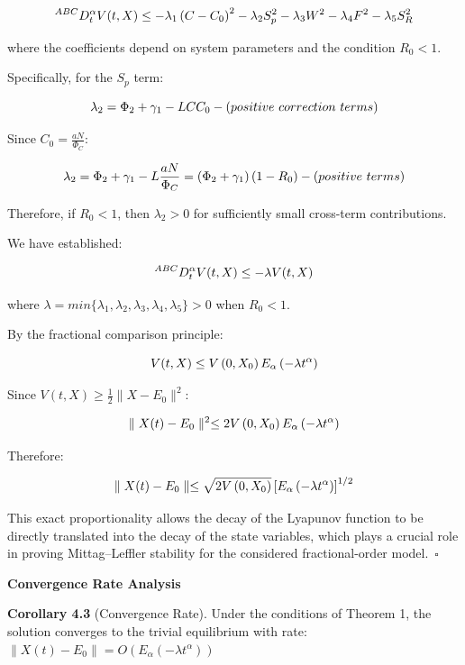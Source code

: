 \documentclass[10pt]{NSP1}
\newcommand{\fitwidth}[1]{\resizebox{\ifdim\width>\linewidth\linewidth\else\width\fi}{!}{#1}}
\begin{document}
\[
\fitwidth{$\displaystyle ^{ABC}D_{t}^{\alpha}V(t,X) \leq - \lambda_{1}\left( C - C_{0} \right)^{2} - \lambda_{2}S_{p}^{2} - \lambda_{3}W^{2} - \lambda_{4}F^{2} - \lambda_{5}S_{R}^{2}$}
\]

where the coefficients depend on system parameters and the condition \(R_{0} < 1\).

Specifically, for the \(S_{p}\) term:

\[
\fitwidth{$\displaystyle \lambda_{2} = \Phi_{2} + \gamma_{1} - LCC_{0} - (positive\ correction\ terms)$}
\]

Since \(C_{0} = \frac{aN}{\Phi_{C}}\):

\[
\fitwidth{$\displaystyle \lambda_{2} = \Phi_{2} + \gamma_{1} - L\frac{aN}{\Phi_{C}} = \left( \Phi_{2} + \gamma_{1} \right)\left( 1 - R_{0} \right) - (positive\ terms)$}
\]

Therefore, if \(R_{0} < 1\), then \(\lambda_{2} > 0\) for sufficiently small cross-term contributions.

We have established:

\[
\fitwidth{$\displaystyle ^{ABC}D_{t}^{\alpha}V(t,X) \leq - \lambda V(t,X)$}
\]

where \(\lambda = min\{\lambda_{1},\lambda_{2},\lambda_{3},\lambda_{4},\lambda_{5}\} > 0\) when \(R_{0} < 1\).

By the fractional comparison principle:

\[
\fitwidth{$\displaystyle V(t,X) \leq V\left( 0,X_{0} \right)E_{\alpha}\left( - \lambda t^{\alpha} \right)$}
\]

Since \(V(t,X) \geq \frac{1}{2} \parallel X - E_{0} \parallel^{2}\):

\[
\fitwidth{$\displaystyle \parallel X(t) - E_{0} \parallel^{2} \leq 2V\left( 0,X_{0} \right)E_{\alpha}\left( - \lambda t^{\alpha} \right)$}
\]

Therefore:

\[
\fitwidth{$\displaystyle \parallel X(t) - E_{0} \parallel \leq \sqrt{2V\left( 0,X_{0} \right)}\left\lbrack E_{\alpha}\left( - \lambda t^{\alpha} \right) \right\rbrack^{1/2}$}
\]

This exact proportionality allows the decay of the Lyapunov function to be directly translated into the decay of the state variables, which plays a crucial role in proving Mittag--Leffler stability for the considered fractional-order model.~$\square$

\textbf{Convergence Rate Analysis}

\textbf{Corollary 4.3} (Convergence Rate). Under the conditions of Theorem 1, the solution converges to the trivial equilibrium with rate: \(\parallel X(t) - E_{0} \parallel = O\left( E_{\alpha}\left( - \lambda t^{\alpha} \right) \right)\)
\end{document}
